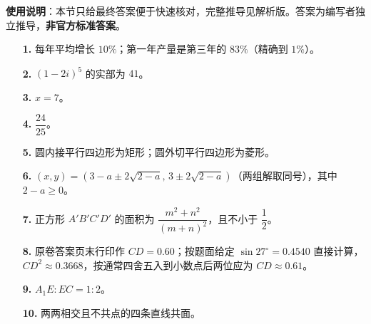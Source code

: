
\begin{gknotice}
\textbf{使用说明}：本节只给最终答案便于快速核对，完整推导见解析版。答案为编写者独立推导，\textbf{非官方标准答案}。
\end{gknotice}

\begin{itemize}[leftmargin=2.6em]
  \item[\textbf{1.}] 每年平均增长 $10\%$；第一年产量是第三年的 $83\%$（精确到 $1\%$）。
  \item[\textbf{2.}] $(1-2i)^5$ 的实部为 $41$。
  \item[\textbf{3.}] $x=7$。
  \item[\textbf{4.}] $\dfrac{24}{25}$。
\end{itemize}

\begin{itemize}[leftmargin=2.6em]
  \item[\textbf{5.}] 圆内接平行四边形为矩形；圆外切平行四边形为菱形。
  \item[\textbf{6.}] $(x,y)=\left(3-a\pm2\sqrt{2-a},\,3\pm2\sqrt{2-a}\right)$（两组解取同号），其中 $2-a\geqslant0$。
  \item[\textbf{7.}] 正方形 $A'B'C'D'$ 的面积为 $\dfrac{m^2+n^2}{(m+n)^2}$，且不小于 $\dfrac12$。
  \item[\textbf{8.}] 原卷答案页末行印作 $CD=0.60$；按题面给定 $\sin27^\circ=0.4540$ 直接计算，$CD^2\approx0.3668$，按通常四舍五入到小数点后两位应为 $CD\approx0.61$。
  \item[\textbf{9.}] $A_1E:EC=1:2$。
  \item[\textbf{10.}] 两两相交且不共点的四条直线共面。
\end{itemize}
